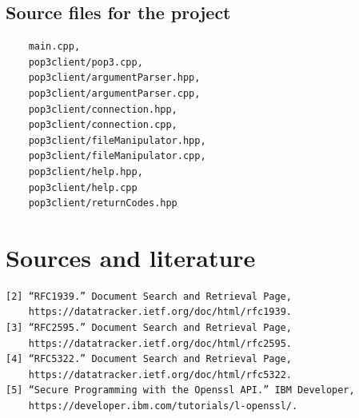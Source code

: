 \documentclass{article}
\begin{document}
\newpage

\subsection{Source files for the project}
\begin{verbatim}
    main.cpp, 
    pop3client/pop3.cpp, 
    pop3client/argumentParser.hpp,
    pop3client/argumentParser.cpp, 
    pop3client/connection.hpp, 
    pop3client/connection.cpp, 
    pop3client/fileManipulator.hpp, 
    pop3client/fileManipulator.cpp, 
    pop3client/help.hpp, 
    pop3client/help.cpp 
    pop3client/returnCodes.hpp
\end{verbatim}

\newpage

\section{Sources and literature}
\begin{verbatim}
[2] “RFC1939.” Document Search and Retrieval Page, 
    https://datatracker.ietf.org/doc/html/rfc1939. 
[3] “RFC2595.” Document Search and Retrieval Page, 
    https://datatracker.ietf.org/doc/html/rfc2595. 
[4] “RFC5322.” Document Search and Retrieval Page, 
    https://datatracker.ietf.org/doc/html/rfc5322. 
[5] “Secure Programming with the Openssl API.” IBM Developer, 
    https://developer.ibm.com/tutorials/l-openssl/. 
\end{verbatim}
%
%
\end{document}

